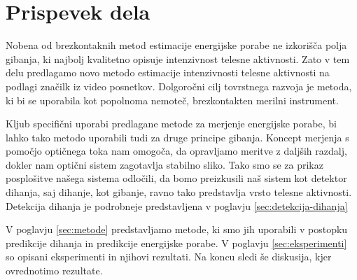 \section{Prispevek dela}
Nobena od brezkontaknih metod estimacije energijske porabe ne izkorišča polja gibanja, ki najbolj kvalitetno opisuje intenzivnost telesne aktivnosti. Zato v tem delu predlagamo novo metodo estimacije intenzivnosti telesne aktivnosti na podlagi značilk iz video posnetkov. Dolgoročni cilj tovrstnega razvoja je metoda, ki bi se uporabila kot popolnoma nemoteč, brezkontakten merilni instrument.

Kljub specifični uporabi predlagane metode za merjenje energijske porabe, bi lahko tako metodo uporabili tudi za druge principe gibanja. Koncept merjenja s pomočjo optičnega toka nam omogoča, da opravljamo meritve z daljših razdalj, dokler nam optični sistem zagotavlja stabilno sliko. Tako smo se za prikaz posplošitve našega sistema odločili, da bomo preizkusili naš sistem kot detektor dihanja, saj dihanje, kot gibanje, ravno tako predstavlja vrsto telesne aktivnosti. Detekcija dihanja je podrobneje predstavljena v poglavju \ref{sec:detekcija-dihanja}

V poglavju \ref{sec:metode}  predstavljamo metode, ki smo jih uporabili v postopku predikcije dihanja in predikcije energijske porabe. V poglavju \ref{sec:eksperimenti} so opisani eksperimenti in njihovi rezultati. Na koncu sledi še diskusija, kjer ovrednotimo rezultate. 

